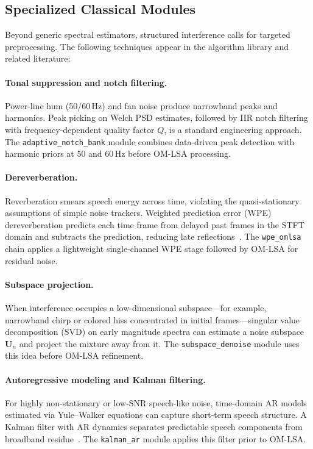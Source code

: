 \subsection{Specialized Classical Modules}
\label{sec:specialized_classical}

Beyond generic spectral estimators, structured interference calls for targeted preprocessing. The following techniques appear in the \projectshort{} algorithm library and related literature:

\paragraph{Tonal suppression and notch filtering.}
Power-line hum (50/60\,Hz) and fan noise produce narrowband peaks and harmonics. Peak picking on Welch PSD estimates, followed by IIR notch filtering with frequency-dependent quality factor $Q$, is a standard engineering approach. The \texttt{adaptive\_notch\_bank} module combines data-driven peak detection with harmonic priors at 50 and 60\,Hz before OM-LSA processing.

\paragraph{Dereverberation.}
Reverberation smears speech energy across time, violating the quasi-stationary assumptions of simple noise trackers. Weighted prediction error (WPE) dereverberation predicts each time frame from delayed past frames in the STFT domain and subtracts the prediction, reducing late reflections~\cite{loizou2013}. The \texttt{wpe\_omlsa} chain applies a lightweight single-channel WPE stage followed by OM-LSA for residual noise.

\paragraph{Subspace projection.}
When interference occupies a low-dimensional subspace---for example, narrowband chirp or colored hiss concentrated in initial frames---singular value decomposition (SVD) on early magnitude spectra can estimate a noise subspace $\mathbf{U}_n$ and project the mixture away from it. The \texttt{subspace\_denoise} module uses this idea before OM-LSA refinement.

\paragraph{Autoregressive modeling and Kalman filtering.}
For highly non-stationary or low-SNR speech-like noise, time-domain AR models estimated via Yule--Walker equations can capture short-term speech structure. A Kalman filter with AR dynamics separates predictable speech components from broadband residue~\cite{loizou2013}. The \texttt{kalman\_ar} module applies this filter prior to OM-LSA.

